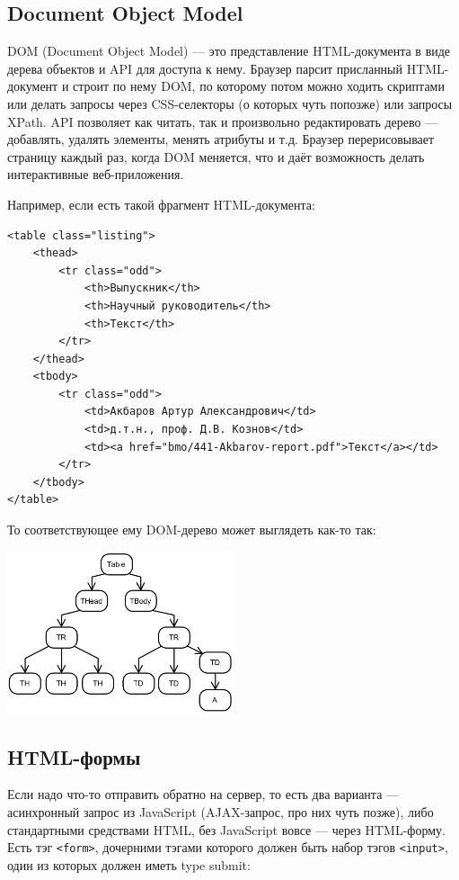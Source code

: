 \documentclass[a5paper]{article}
\begin{document}
\subsection{Document Object Model}

DOM (Document Object Model) --- это представление HTML-документа в виде дерева объектов и API для доступа к нему. Браузер парсит присланный HTML-документ и строит по нему DOM, по которому потом можно ходить скриптами или делать запросы через CSS-селекторы (о которых чуть попозже) или запросы XPath. API позволяет как читать, так и произвольно редактировать дерево --- добавлять, удалять элементы, менять атрибуты и т.д. Браузер перерисовывает страницу каждый раз, когда DOM меняется, что и даёт возможность делать интерактивные веб-приложения.

Например, если есть такой фрагмент HTML-документа:

\begin{verbatim}
<table class="listing">
    <thead>
        <tr class="odd">
            <th>Выпускник</th>
            <th>Научный руководитель</th>
            <th>Текст</th>
        </tr>
    </thead>
    <tbody>
        <tr class="odd">
            <td>Акбаров Артур Александрович</td>
            <td>д.т.н., проф. Д.В. Кознов</td>
            <td><a href="bmo/441-Akbarov-report.pdf">Текст</a></td>
        </tr>
    </tbody>
</table>
\end{verbatim}

То соответствующее ему DOM-дерево может выглядеть как-то так:

\begin{center}
    \includegraphics[width=0.5\textwidth]{domTree.png}
\end{center}

\subsection{HTML-формы}

Если надо что-то отправить обратно на сервер, то есть два варианта --- асинхронный запрос из JavaScript (AJAX-запрос, про них чуть позже), либо стандартными средствами HTML, без JavaScript вовсе --- через HTML-форму. Есть тэг \texttt{<form>}, дочерними тэгами которого должен быть набор тэгов \texttt{<input>}, один из которых должен иметь type submit:
\end{document}

